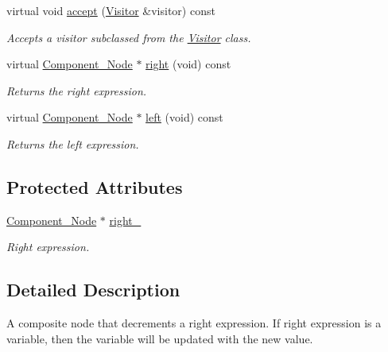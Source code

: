 \begin{DoxyCompactItemize}
virtual void \hyperlink{classMadara_1_1Expression__Tree_1_1Composite__Predecrement__Node_a1a66cbc5d00d8e07a5f75b769b12a37b}{accept} (\hyperlink{classMadara_1_1Expression__Tree_1_1Visitor}{Visitor} \&visitor) const 
\begin{DoxyCompactList}\small\item\em Accepts a visitor subclassed from the \hyperlink{classMadara_1_1Expression__Tree_1_1Visitor}{Visitor} class. \item\end{DoxyCompactList}\item 
virtual \hyperlink{classMadara_1_1Expression__Tree_1_1Component__Node}{Component\_\-Node} $\ast$ \hyperlink{classMadara_1_1Expression__Tree_1_1Composite__Unary__Node_ade55cde5707e0fa73ab1c019159b9aec}{right} (void) const 
\begin{DoxyCompactList}\small\item\em Returns the right expression. \item\end{DoxyCompactList}\item 
virtual \hyperlink{classMadara_1_1Expression__Tree_1_1Component__Node}{Component\_\-Node} $\ast$ \hyperlink{classMadara_1_1Expression__Tree_1_1Component__Node_abe0c7474f1af4cb06d06ab13479a89db}{left} (void) const 
\begin{DoxyCompactList}\small\item\em Returns the left expression. \item\end{DoxyCompactList}\end{DoxyCompactItemize}
\subsection*{Protected Attributes}
\begin{DoxyCompactItemize}
\item 
\hyperlink{classMadara_1_1Expression__Tree_1_1Component__Node}{Component\_\-Node} $\ast$ \hyperlink{classMadara_1_1Expression__Tree_1_1Composite__Unary__Node_a077b7bd1b52df6f5c6adfde735556a68}{right\_\-}
\begin{DoxyCompactList}\small\item\em Right expression. \item\end{DoxyCompactList}\end{DoxyCompactItemize}


\subsection{Detailed Description}
A composite node that decrements a right expression. If right expression is a variable, then the variable will be updated with the new value. 

